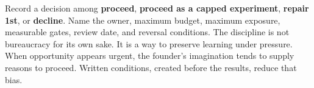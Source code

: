 Record a decision among \textbf{proceed}, \textbf{proceed as a capped experiment}, \textbf{repair 1st}, or \textbf{decline}. Name the owner, maximum budget, maximum exposure, measurable gates, review date, and reversal conditions. The discipline is not bureaucracy for its own sake. It is a way to preserve learning under pressure. When opportunity appears urgent, the founder's imagination tends to supply reasons to proceed. Written conditions, created before the results, reduce that bias.
